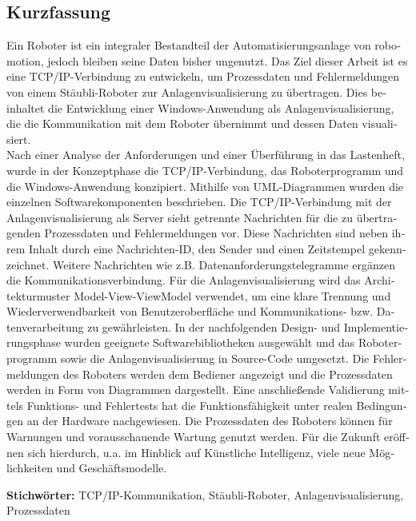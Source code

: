 \cleardoublepage

\begin{otherlanguage}{ngerman}
\chapter*{Kurzfassung}
Ein Roboter ist ein integraler Bestandteil der Automatisierungsanlage von robomotion, jedoch bleiben seine Daten bisher ungenutzt. Das Ziel dieser Arbeit ist es eine TCP/IP-Verbindung zu entwickeln, um Prozessdaten und Fehlermeldungen von einem Stäubli-Roboter zur Anlagenvisualisierung zu übertragen. Dies beinhaltet die Entwicklung einer Windows-Anwendung als Anlagenvisualisierung, die die Kommunikation mit dem Roboter übernimmt und dessen Daten visualisiert.\\
Nach einer Analyse der Anforderungen und einer Überführung in das Lastenheft, wurde in der Konzeptphase die TCP/IP-Verbindung, das Roboterprogramm und die Windows-Anwendung konzipiert. Mithilfe von UML-Diagrammen wurden die einzelnen Softwarekomponenten beschrieben. Die TCP/IP-Verbindung mit der Anlagenvisualisierung als Server sieht getrennte Nachrichten für die zu übertragenden Prozessdaten und Fehlermeldungen vor. Diese Nachrichten sind neben ihrem Inhalt durch eine Nachrichten-ID, den Sender und einen Zeitstempel gekennzeichnet. Weitere Nachrichten wie z.B. Datenanforderungstelegramme ergänzen die Kommunikationsverbindung. Für die Anlagenvisualisierung wird das Architekturmuster Model-View-ViewModel verwendet, um eine klare Trennung und Wiederverwendbarkeit von Benutzeroberfläche und Kommunikations- bzw. Datenverarbeitung zu gewährleisten. In der nachfolgenden Design- und Implementierungsphase wurden geeignete Softwarebibliotheken ausgewählt und das Roboterprogramm sowie die Anlagenvisualisierung in Source-Code umgesetzt. Die Fehlermeldungen des Roboters werden dem Bediener angezeigt und die Prozessdaten werden in Form von Diagrammen dargestellt. Eine anschließende Validierung mittels Funktions- und Fehlertests hat die Funktionsfähigkeit unter realen Bedingungen an der Hardware nachgewiesen. Die Prozessdaten des Roboters können für Warnungen und vorausschauende Wartung genutzt werden. Für die Zukunft eröffnen sich hierdurch, u.a. im Hinblick auf Künstliche Intelligenz, viele neue Möglichkeiten und Geschäftsmodelle.


\vfill
\noindent\textbf{Stichwörter:} TCP/IP-Kommunikation, Stäubli-Roboter, Anlagenvisualisierung, Prozessdaten
\vfill
\end{otherlanguage}
